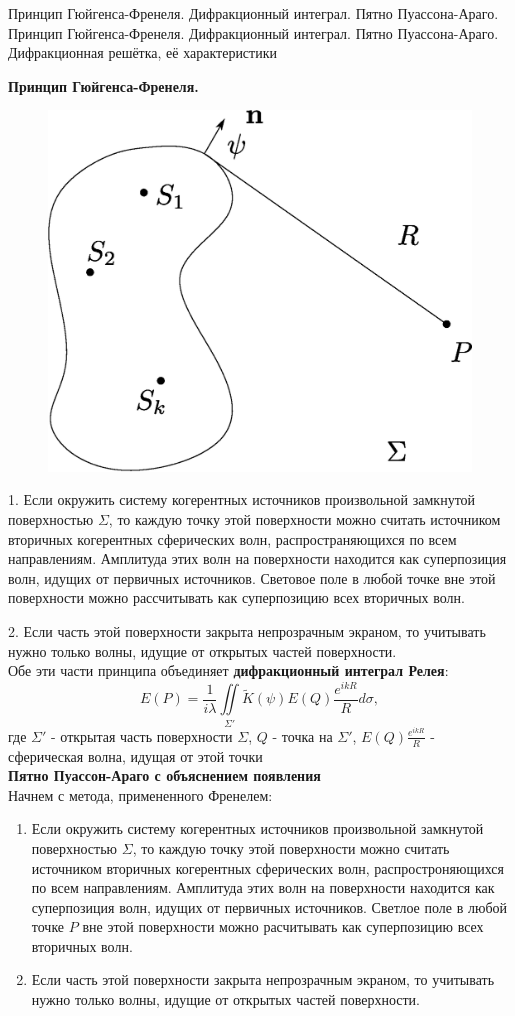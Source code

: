 \documentclass[__main__.tex]{subfiles}
\begin{document}
Принцип Гюйгенса-Френеля. Дифракционный интеграл. Пятно Пуассона-Араго.\\ 

Принцип Гюйгенса-Френеля. Дифракционный интеграл. Пятно Пуассона-Араго. Дифракционная решётка, её характеристики

\textbf{Принцип Гюйгенса-Френеля. }\\

\begin{figure}[h]
	\begin{center}
		\includegraphics[width=0.5\linewidth]{img/o-08_1.eps}
	\end{center}
\end{figure}

1. Если окружить систему когерентных источников произвольной замкнутой поверхностью $\Sigma$, то каждую точку этой поверхности можно считать источником вторичных когерентных сферических волн, распространяющихся по всем направлениям. Амплитуда этих волн на поверхности находится как суперпозиция волн, идущих от первичных источников. Световое поле в любой точке вне этой поверхности можно рассчитывать как суперпозицию всех вторичных волн. 

2. Если часть этой поверхности закрыта непрозрачным экраном, то учитывать нужно только волны, идущие от открытых частей поверхности.\\

Обе эти части принципа объединяет \textbf{дифракционный интеграл Релея}:
$$E(P) = \frac{1}{i\lambda}\iint\limits_{\Sigma'} \widetilde K(\psi) E(Q)\frac{e^{ikR}}{R}d\sigma,$$
где $\Sigma'$ - открытая часть поверхности $\Sigma$, $Q$ - точка на $\Sigma'$, $E(Q)\frac{e^{ikR}}{R}$ - сферическая волна, идущая от этой точки\\ 

\textbf{Пятно Пуассон-Араго с объяснением появления}\\
Начнем с метода, примененного Френелем:
\begin{enumerate}
\item
Если окружить систему когерентных источников произвольной замкнутой поверхностью $\Sigma$, то каждую точку этой поверхности можно считать источником вторичных когерентных сферических волн, распростроняющихся по всем направлениям. Амплитуда этих волн на поверхности находится как суперпозиция волн, идущих от первичных источников. Светлое поле в любой точке $P$ вне этой поверхности можно расчитывать как суперпозицию всех вторичных волн.
\item
Если часть этой поверхности закрыта непрозрачным экраном, то учитывать нужно только волны, идущие от открытых частей поверхности.
\end{enumerate}
\end{document}

